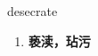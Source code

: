 
\begin{frame}
{\huge desecrate}
\begin{center}
\begin{enumerate}\Large
  \item \textbf{亵渎，玷污}
\end{enumerate}
\end{center}
\end{frame}
